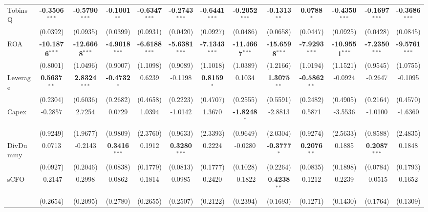 \begin{landscape}
\begin{table}[H]
\begin{tabular}{lcccccccccccc}
TobinsQ & \textbf{-0.3506}$^{***}$ & \textbf{-0.5790}$^{***}$ & \textbf{-0.1001}$^{**}$ & \textbf{-0.6347}$^{***}$ & \textbf{-0.2743}$^{***}$ & \textbf{-0.6441}$^{***}$ & \textbf{-0.2052}$^{***}$ & \textbf{-0.1313}$^{**}$ & \textbf{0.0788}$^{*}$ & \textbf{-0.4350}$^{***}$ & \textbf{-0.1697}$^{***}$ & \textbf{-0.3686}$^{***}$ \\
 & (0.0392) & (0.0935) & (0.0399) & (0.0931) & (0.0420) & (0.0927) & (0.0486) & (0.0658) & (0.0447) & (0.0925) & (0.0428) & (0.0845) \\
ROA & \textbf{-10.1876}$^{***}$ & \textbf{-12.6668}$^{***}$ & \textbf{-4.9018}$^{***}$ & \textbf{-6.6188}$^{***}$ & \textbf{-5.6381}$^{***}$ & \textbf{-7.1343}$^{***}$ & \textbf{-11.4667}$^{***}$ & \textbf{-15.6598}$^{***}$ & \textbf{-7.9293}$^{***}$ & \textbf{-10.9551}$^{***}$ & \textbf{-7.2350}$^{***}$ & \textbf{-9.5761}$^{***}$ \\
 & (0.8001) & (1.0496) & (0.9007) & (1.1098) & (0.9089) & (1.1018) & (1.0389) & (1.2166) & (1.0194) & (1.1521) & (0.9545) & (1.0755) \\
Leverage & \textbf{0.5637}$^{**}$ & \textbf{2.8324}$^{***}$ & \textbf{-0.4732}$^{*}$ & 0.6239 & -0.1198 & \textbf{0.8159}$^{*}$ & 0.1034 & \textbf{1.3075}$^{**}$ & \textbf{-0.5862}$^{**}$ & -0.0924 & -0.2647 & -0.1095 \\
 & (0.2304) & (0.6036) & (0.2682) & (0.4658) & (0.2223) & (0.4707) & (0.2555) & (0.5591) & (0.2482) & (0.4905) & (0.2164) & (0.4570) \\
Capex & -0.2857 & 2.7254 & 0.0729 & 1.0394 & -1.0142 & 1.3670 & \textbf{-1.8248}$^{*}$ & -2.8813 & 0.5871 & -3.5536 & -1.0100 & -1.6360 \\
 & (0.9249) & (1.9677) & (0.9809) & (2.3760) & (0.9633) & (2.3393) & (0.9649) & (2.0304) & (0.9274) & (2.5633) & (0.8588) & (2.4835) \\
DivDummy & 0.0713 & -0.2143 & \textbf{0.3416}$^{***}$ & 0.1912 & \textbf{0.3280}$^{***}$ & 0.2224 & -0.0280 & \textbf{-0.3777}$^{*}$ & \textbf{0.2076}$^{**}$ & 0.1885 & \textbf{0.2087}$^{***}$ & 0.1848 \\
 & (0.0927) & (0.2046) & (0.0838) & (0.1779) & (0.0813) & (0.1777) & (0.1028) & (0.2264) & (0.0835) & (0.1898) & (0.0784) & (0.1793) \\
sCFO & -0.2147 & 0.2998 & 0.0862 & 0.1814 & 0.0985 & 0.2420 & -0.1822 & \textbf{0.4238}$^{**}$ & 0.1212 & 0.2239 & -0.0515 & 0.1652 \\
 & (0.2654) & (0.2095) & (0.2780) & (0.2655) & (0.2507) & (0.2122) & (0.2394) & (0.1693) & (0.1271) & (0.1430) & (0.1764) & (0.1309) \\

\end{tabular}
\end{table}
\end{landscape}
